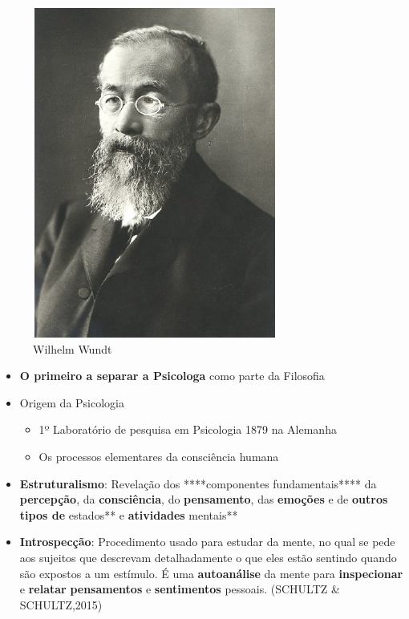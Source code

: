\documentclass[
]{book}
\providecommand{\tightlist}{%
  \setlength{\itemsep}{0pt}\setlength{\parskip}{0pt}}
\begin{document}
\begin{figure}

{\centering \includegraphics[width=0.5\linewidth]{imagens/WilhelmWundt} 

}

\caption{Wilhelm Wundt}\label{fig:unnamed-chunk-5}
\end{figure}

\begin{itemize}
\tightlist
\item
  \textbf{O primeiro a separar a Psicologa} como parte da Filosofia
\item
  Origem da Psicologia

  \begin{itemize}
  \tightlist
  \item
    1º Laboratório de pesquisa em Psicologia 1879 na Alemanha
  \item
    Os processos elementares da consciência humana
  \end{itemize}
\item
  \textbf{Estruturalismo}: Revelação dos ****componentes fundamentais**** da \textbf{percepção}, da \textbf{consciência}, do \textbf{pensamento}, das \textbf{emoções} e de \textbf{outros tipos de }estados** e \textbf{atividades} mentais**
\item
  \textbf{Introspecção}: Procedimento usado para estudar da mente, no qual se pede aos sujeitos que descrevam detalhadamente o que eles estão sentindo quando são expostos a um estímulo. É uma \textbf{autoanálise} da mente para \textbf{inspecionar} e \textbf{relatar} \textbf{pensamentos} e \textbf{sentimentos} pessoais. (SCHULTZ \& SCHULTZ,2015)
\end{itemize}
\end{document}
